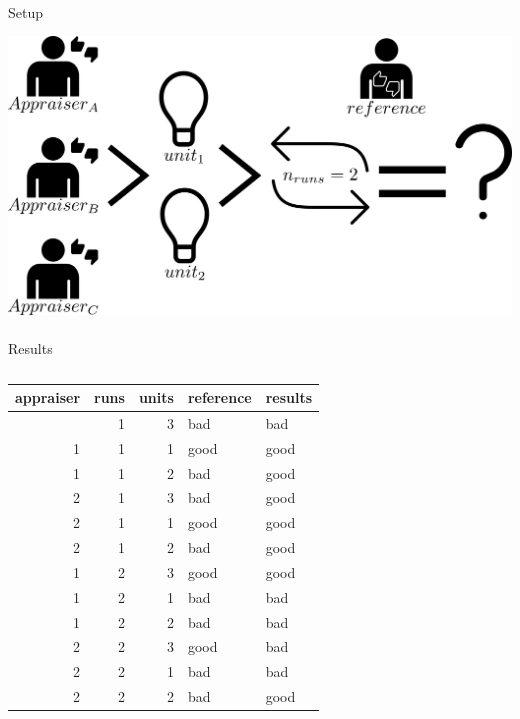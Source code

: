 \documentclass[
  a4paper,
]{scrbook}
\makeatletter
\let\oldparagraph\paragraph
\renewcommand{\paragraph}{
    \@ifstar
      \xxxParagraphStar
      \xxxParagraphNoStar
  }
\newcommand{\xxxParagraphStar}[1]{\oldparagraph*{#1}\mbox{}}
\newcommand{\xxxParagraphNoStar}[1]{\oldparagraph{#1}\mbox{}}
\makeatother
\begin{document}
\paragraph{Setup}\label{setup}

\includegraphics[width=0.95\linewidth,height=\textheight,keepaspectratio]{chapter004/aaa.png}

\paragraph{Results}\label{results}

\begingroup
\fontsize{12.0pt}{14.4pt}\selectfont

\begin{longtable}{rrrll}

\caption{\label{tbl-aaa}}

\tabularnewline

\toprule
appraiser & runs & units & reference & results \\ 
\midrule\addlinespace[2.5pt]
1 & 1 & 3 & bad & bad \\ 
1 & 1 & 1 & good & good \\ 
1 & 1 & 2 & bad & good \\ 
2 & 1 & 3 & bad & good \\ 
2 & 1 & 1 & good & good \\ 
2 & 1 & 2 & bad & good \\ 
1 & 2 & 3 & good & good \\ 
1 & 2 & 1 & bad & bad \\ 
1 & 2 & 2 & bad & bad \\ 
2 & 2 & 3 & good & bad \\ 
2 & 2 & 1 & bad & bad \\ 
2 & 2 & 2 & bad & good \\ 
\bottomrule

\end{longtable}
\end{document}
